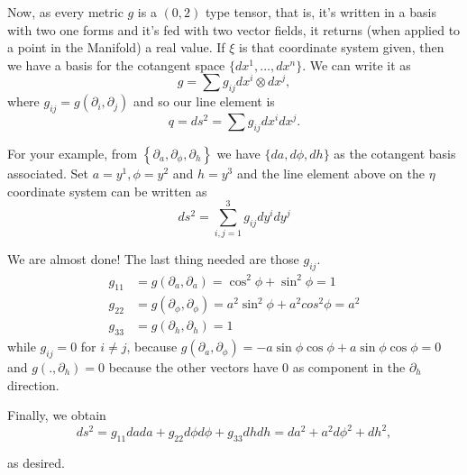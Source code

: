 \documentclass{article}
\begin{document}
Now, as every metric $g$ is a $(0,2)$ type tensor, that is, it's written in a basis with two one forms and it's fed with two vector fields, it returns (when applied to a point in the Manifold) a real value. If $\xi$ is that coordinate system given, then we have a basis for the cotangent space $\{dx^{1}, \ldots, dx^{n}\}$. We can write it as
\begin{equation}
       g = \sum g_{ij} dx^{i} \otimes dx^{j},
\end{equation}
where $g_{ij} = g\left(\partial_i,\partial_j \right)$ and so our line element is
$$q = ds^{2} = \sum g_{ij} dx^{i}dx^{j}.$$

For your example, from $\left\{\partial_a, \partial_\phi, \partial_h\right\}$ we have $\{da, d\phi, dh\}$ as the cotangent basis associated. Set $a = y^{1}, \phi = y^{2}$ and $h = y^{3}$ and the line element above on the $\eta$ coordinate system can be written as 
$$ds^{2} = \sum_{i,j = 1}^{3} g_{ij} dy^{i}dy^{j}$$

We are almost done! The last thing needed are those $g_{ij}$.
\begin{align}
    g_{11} &= g(\partial_a, \partial_a) = \cos^{2}\phi + \sin^{2}\phi = 1\\
    g_{22} &= g(\partial_\phi, \partial_\phi) = a^{2}\sin^{2}\phi + a^{2}cos^{2}\phi = a^{2}\\
    g_{33} &= g(\partial_h,\partial_h) = 1
\end{align}
while $g_{ij} = 0$ for $i \neq j$, because $g(\partial_a,\partial_\phi) = -a\sin\phi\cos\phi + a\sin\phi\cos\phi = 0$ and $g(.,\partial_h) = 0$ because the other vectors have $0$ as component in the $\partial_h$ direction.

Finally, we obtain
\begin{equation}
    ds^{2} = g_{11}da da + g_{22}d\phi d\phi + g_{33}dh dh = da^{2} + a^{2}d\phi^{2} + dh^{2},
\end{equation}

as desired.
\end{document}
